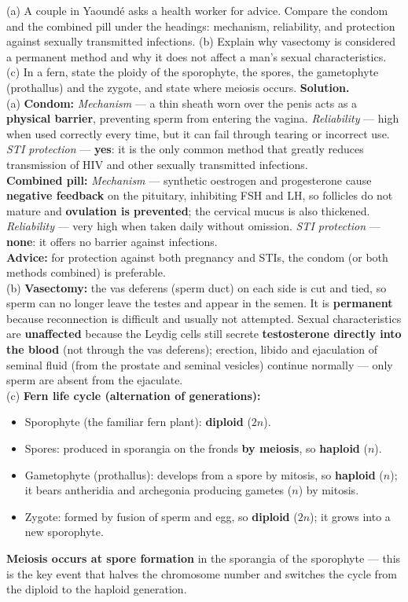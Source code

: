 \documentclass[11pt]{article}
\newcommand{\cle}[1]{{\popxbold\color{popdark}#1}}
\begin{document}
\begin{exoresolu}
(a) A couple in Yaoundé asks a health worker for advice. Compare the condom and the combined pill under the headings: mechanism, reliability, and protection against sexually transmitted infections. (b) Explain why vasectomy is considered a permanent method and why it does not affect a man's sexual characteristics. (c) In a fern, state the ploidy of the sporophyte, the spores, the gametophyte (prothallus) and the zygote, and state where meiosis occurs.
\tcblower
\textbf{Solution.}\\
(a) \textbf{Condom:} \emph{Mechanism} — a thin sheath worn over the penis acts as a \textbf{physical barrier}, preventing sperm from entering the vagina. \emph{Reliability} — high when used correctly every time, but it can fail through tearing or incorrect use. \emph{STI protection} — \textbf{yes}: it is the only common method that greatly reduces transmission of HIV and other sexually transmitted infections.\\
\textbf{Combined pill:} \emph{Mechanism} — synthetic oestrogen and progesterone cause \textbf{negative feedback} on the pituitary, inhibiting FSH and LH, so follicles do not mature and \textbf{ovulation is prevented}; the cervical mucus is also thickened. \emph{Reliability} — very high when taken daily without omission. \emph{STI protection} — \textbf{none}: it offers no barrier against infections.\\
\textbf{Advice:} for protection against both pregnancy and STIs, the condom (or both methods combined) is preferable.\\
(b) \textbf{Vasectomy:} the \cle{vas deferens} (sperm duct) on each side is cut and tied, so sperm can no longer leave the testes and appear in the semen. It is \textbf{permanent} because reconnection is difficult and usually not attempted. Sexual characteristics are \textbf{unaffected} because the Leydig cells still secrete \textbf{testosterone directly into the blood} (not through the vas deferens); erection, libido and ejaculation of seminal fluid (from the prostate and seminal vesicles) continue normally — only sperm are absent from the ejaculate.\\
(c) \textbf{Fern life cycle (alternation of generations):}
\begin{itemize}
\item Sporophyte (the familiar fern plant): \textbf{diploid} ($2n$).
\item Spores: produced in sporangia on the fronds \textbf{by meiosis}, so \textbf{haploid} ($n$).
\item Gametophyte (prothallus): develops from a spore by mitosis, so \textbf{haploid} ($n$); it bears antheridia and archegonia producing gametes ($n$) by mitosis.
\item Zygote: formed by fusion of sperm and egg, so \textbf{diploid} ($2n$); it grows into a new sporophyte.
\end{itemize}
\textbf{Meiosis occurs at spore formation} in the sporangia of the sporophyte — this is the key event that halves the chromosome number and switches the cycle from the diploid to the haploid generation.
\end{exoresolu}
\end{document}
